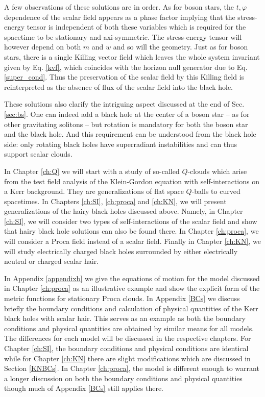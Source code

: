 A few observations of these solutions are in order.
As for boson stars, the $t,\varphi$ dependence of the scalar field appears as a phase factor implying that the stress-energy tensor is independent of both these variables which is required for the spacetime to be stationary and axi-symmetric.
The stress-energy tensor will however depend on both $m$ and $w$ and so will the geometry.
Just as for boson stars, there is a single Killing vector field which leaves the whole system invariant given by Eq. \eqref{kvf},
which coincides with the horizon null generator due to Eq. \eqref{super_cond}.
Thus the preservation of the scalar field by this Killing field is reinterpreted as the absence of flux of the scalar field into the black hole.

These solutions also clarify the intriguing aspect discussed at the end of Sec. \ref{sec:bs}.
One can indeed add a black hole at the center of a boson star -- as for other gravitating solitons -- but rotation is mandatory for both the boson star and the black hole.
And this requirement can be understood from the black hole side: only rotating black holes have superradiant instabilities and can thus support scalar clouds. 

In Chapter \ref{ch:Q} we will start with a study of so-called $Q$-clouds which arise from the test field analysis of the Klein-Gordon equation with self-interactions on a Kerr background.
They are generalizations of flat space $Q$-balls to curved spacetimes.
In Chapters \ref{ch:SI}, \ref{ch:proca} and \ref{ch:KN}, we will present generalizations of the hairy black holes discussed above.
Namely, in Chapter \ref{ch:SI}, we will consider two types of self-interactions of the scalar field and show that hairy black hole solutions can also be found there.
In Chapter \ref{ch:proca}, we will consider a Proca field instead of a scalar field.
Finally in Chapter \ref{ch:KN}, we will study electrically charged black holes surrounded by either electrically neutral or charged scalar hair.

In Appendix \ref{appendixb} we give the equations of motion for the model discussed in Chapter \ref{ch:proca} as an illustrative example and show the explicit form of the metric functions for stationary Proca clouds.
In Appendix \ref{BCs} we discuss briefly the boundary conditions and calculation of physical quantities of the Kerr black holes with scalar hair.
This serves as an example as both the boundary conditions and physical quantities are obtained by similar means for all models.
The differences for each model will be discussed in the respective chapters.
For Chapter \ref{ch:SI}, the boundary conditions and physical conditions are identical while for Chapter \ref{ch:KN} there are slight modifications which are discussed in Section \ref{KNBCs}.
In Chapter \ref{ch:proca}, the model is different enough to warrant a longer discussion on both the boundary conditions and physical quantities though much of Appendix \ref{BCs} still applies there.


